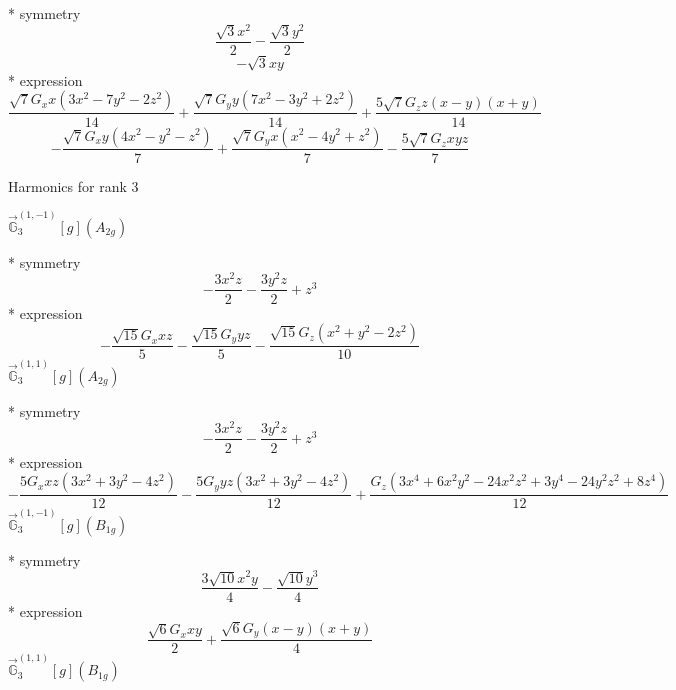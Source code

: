 \documentclass[fleqn,8pt]{jsarticle}
\begin{document}
\noindent\quad ** symmetry
\begin{dmath*}
\frac{\sqrt{3} x^{2}}{2} - \frac{\sqrt{3} y^{2}}{2}
\end{dmath*}
\begin{dmath*}
- \sqrt{3} x y
\end{dmath*}
\noindent\quad ** expression
\begin{dmath*}
\frac{\sqrt{7} G_{x} x \left(3 x^{2} - 7 y^{2} - 2 z^{2}\right)}{14} + \frac{\sqrt{7} G_{y} y \left(7 x^{2} - 3 y^{2} + 2 z^{2}\right)}{14} + \frac{5 \sqrt{7} G_{z} z \left(x - y\right) \left(x + y\right)}{14}
\end{dmath*}
\begin{dmath*}
- \frac{\sqrt{7} G_{x} y \left(4 x^{2} - y^{2} - z^{2}\right)}{7} + \frac{\sqrt{7} G_{y} x \left(x^{2} - 4 y^{2} + z^{2}\right)}{7} - \frac{5 \sqrt{7} G_{z} x y z}{7}
\end{dmath*}

\noindent * Harmonics for rank 3

\noindent\quad $\vec{\mathbb{G}}_{3}^{(1,-1)}[g](A_{2g})$

\noindent\quad ** symmetry
\begin{dmath*}
- \frac{3 x^{2} z}{2} - \frac{3 y^{2} z}{2} + z^{3}
\end{dmath*}
\noindent\quad ** expression
\begin{dmath*}
- \frac{\sqrt{15} G_{x} x z}{5} - \frac{\sqrt{15} G_{y} y z}{5} - \frac{\sqrt{15} G_{z} \left(x^{2} + y^{2} - 2 z^{2}\right)}{10}
\end{dmath*}
\noindent\quad $\vec{\mathbb{G}}_{3}^{(1,1)}[g](A_{2g})$

\noindent\quad ** symmetry
\begin{dmath*}
- \frac{3 x^{2} z}{2} - \frac{3 y^{2} z}{2} + z^{3}
\end{dmath*}
\noindent\quad ** expression
\begin{dmath*}
- \frac{5 G_{x} x z \left(3 x^{2} + 3 y^{2} - 4 z^{2}\right)}{12} - \frac{5 G_{y} y z \left(3 x^{2} + 3 y^{2} - 4 z^{2}\right)}{12} + \frac{G_{z} \left(3 x^{4} + 6 x^{2} y^{2} - 24 x^{2} z^{2} + 3 y^{4} - 24 y^{2} z^{2} + 8 z^{4}\right)}{12}
\end{dmath*}
\noindent\quad $\vec{\mathbb{G}}_{3}^{(1,-1)}[g](B_{1g})$

\noindent\quad ** symmetry
\begin{dmath*}
\frac{3 \sqrt{10} x^{2} y}{4} - \frac{\sqrt{10} y^{3}}{4}
\end{dmath*}
\noindent\quad ** expression
\begin{dmath*}
\frac{\sqrt{6} G_{x} x y}{2} + \frac{\sqrt{6} G_{y} \left(x - y\right) \left(x + y\right)}{4}
\end{dmath*}
\noindent\quad $\vec{\mathbb{G}}_{3}^{(1,1)}[g](B_{1g})$
\end{document}
